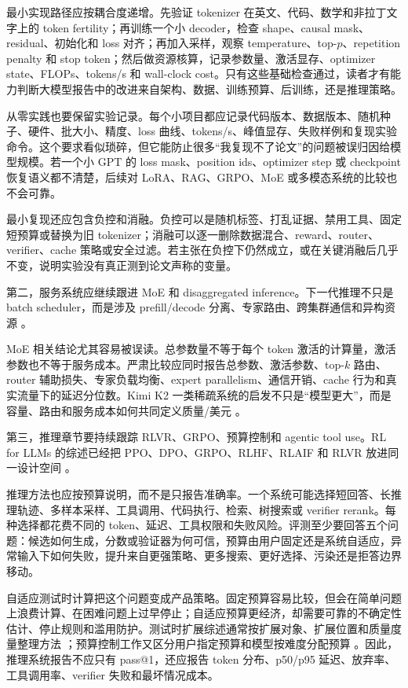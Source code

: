 \documentclass[UTF8,zihao=-4,openany]{ctexbook}
\begin{document}
最小实现路径应按耦合度递增。先验证 tokenizer 在英文、代码、数学和非拉丁文字上的 token fertility；再训练一个小 decoder，检查 shape、causal mask、residual、初始化和 loss 对齐；再加入采样，观察 temperature、top-$p$、repetition penalty 和 stop token；然后做资源核算，记录参数量、激活显存、optimizer state、FLOPs、tokens/s 和 wall-clock cost。只有这些基础检查通过，读者才有能力判断大模型报告中的改进来自架构、数据、训练预算、后训练，还是推理策略。

从零实践也要保留实验记录。每个小项目都应记录代码版本、数据版本、随机种子、硬件、批大小、精度、loss 曲线、tokens/s、峰值显存、失败样例和复现实验命令。这个要求看似琐碎，但它能防止很多“我复现不了论文”的问题被误归因给模型规模。若一个小 GPT 的 loss mask、position ids、optimizer step 或 checkpoint 恢复语义都不清楚，后续对 LoRA、RAG、GRPO、MoE 或多模态系统的比较也不会可靠。

最小复现还应包含负控和消融。负控可以是随机标签、打乱证据、禁用工具、固定短预算或替换为旧 tokenizer；消融可以逐一删除数据混合、reward、router、verifier、cache 策略或安全过滤。若主张在负控下仍然成立，或在关键消融后几乎不变，说明实验没有真正测到论文声称的变量。

第二，服务系统应继续跟进 MoE 和 disaggregated inference。下一代推理不只是 batch scheduler，而是涉及 prefill/decode 分离、专家路由、跨集群通信和异构资源 \cite{feng2025frontier}。

MoE 相关结论尤其容易被误读。总参数量不等于每个 token 激活的计算量，激活参数也不等于服务成本。严肃比较应同时报告总参数、激活参数、top-$k$ 路由、router 辅助损失、专家负载均衡、expert parallelism、通信开销、cache 行为和真实流量下的延迟分位数。Kimi K2 一类稀疏系统的启发不只是“模型更大”，而是容量、路由和服务成本如何共同定义质量/美元 \cite{kimi2025k2}。

第三，推理章节要持续跟踪 RLVR、GRPO、预算控制和 agentic tool use。RL for LLMs 的综述已经把 PPO、DPO、GRPO、RLHF、RLAIF 和 RLVR 放进同一设计空间 \cite{srivastava2025rlsurvey}。

推理方法也应按预算说明，而不是只报告准确率。一个系统可能选择短回答、长推理轨迹、多样本采样、工具调用、代码执行、检索、树搜索或 verifier rerank。每种选择都花费不同的 token、延迟、工具权限和失败风险。评测至少要回答五个问题：候选如何生成，分数或验证器为何可信，预算由用户固定还是系统自适应，异常输入下如何失败，提升来自更强策略、更多搜索、更好选择、污染还是拒答边界移动。

自适应测试时计算把这个问题变成产品策略。固定预算容易比较，但会在简单问题上浪费计算、在困难问题上过早停止；自适应预算更经济，却需要可靠的不确定性估计、停止规则和滥用防护。测试时扩展综述通常按扩展对象、扩展位置和质量度量整理方法 \cite{zhang2025testtimescaling}；预算控制工作又区分用户指定预算和模型按难度分配预算 \cite{alomrani2025budget}。因此，推理系统报告不应只有 pass@1，还应报告 token 分布、p50/p95 延迟、放弃率、工具调用率、verifier 失败和最坏情况成本。
\end{document}
